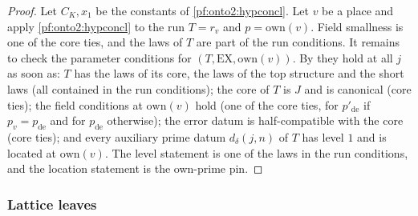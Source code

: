 \begin{proof}
Let $C_K,x_1$ be the constants of \cref{pf:onto2:hypconcl}. Let $v$ be a place and apply \cref{pf:onto2:hypconcl} to the run
$T=r_v$ and $p=\mathrm{own}(v)$. Field smallness is one of the core
ties, and the laws of $T$ are part of the run conditions. It remains to check the parameter conditions for
$(T,\mathrm{EX},\mathrm{own}(v))$. By  they
hold at all $j$ as soon as: $T$ has the laws of its core, the laws of the top structure and the short laws (all contained in
the run conditions); the core of $T$ is $J$ and is canonical (core ties); the field conditions at $\mathrm{own}(v)$ hold (one of
the core ties, for $p'_{\mathrm{de}}$ if $p_v=p_{\mathrm{de}}$ and for $p_{\mathrm{de}}$ otherwise); the error datum is
half-compatible with the core (core ties); and every auxiliary prime datum $d_\delta(j,n)$ of $T$ has level $1$ and is located at
$\mathrm{own}(v)$. The level statement is one of the laws in the run conditions, and the location statement is the own-prime pin.
\end{proof}

\subsubsection{Lattice leaves}\label{sec:pf:onto2:lat}

